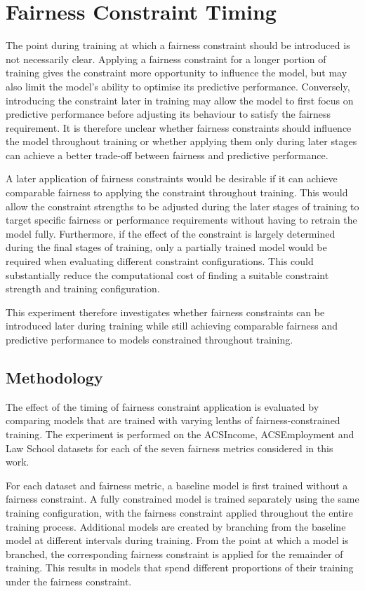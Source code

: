\chapter{Fairness Constraint Timing}
The point during training at which a fairness constraint should be introduced is not necessarily clear. Applying a fairness constraint for a longer portion of training gives the constraint more opportunity to influence the model, but may also limit the model's ability to optimise its predictive performance. Conversely, introducing the constraint later in training may allow the model to first focus on predictive performance before adjusting its behaviour to satisfy the fairness requirement. It is therefore unclear whether fairness constraints should influence the model throughout training or whether applying them only during later stages can achieve a better trade-off between fairness and predictive performance.

A later application of fairness constraints would be desirable if it can achieve comparable fairness to applying the constraint throughout training. This would allow the constraint strengths to be adjusted during the later stages of training to target specific fairness or performance requirements without having to retrain the model fully. Furthermore, if the effect of the constraint is largely determined during the final stages of training, only a partially trained model would be required when evaluating different constraint configurations. This could substantially reduce the computational cost of finding a suitable constraint strength and training configuration.

This experiment therefore investigates whether fairness constraints can be introduced later during training while still achieving comparable fairness and predictive performance to models constrained throughout training.

\section{Methodology}
The effect of the timing of fairness constraint application is evaluated by comparing models that are trained with varying lenths of fairness-constrained training. The experiment is performed on the ACSIncome, ACSEmployment and Law School datasets for each of the seven fairness metrics considered in this work.

For each dataset and fairness metric, a baseline model is first trained without a fairness constraint. A fully constrained model is trained separately using the same training configuration, with the fairness constraint applied throughout the entire training process. Additional models are created by branching from the baseline model at different intervals during training. From the point at which a model is branched, the corresponding fairness constraint is applied for the remainder of training. This results in models that spend different proportions of their training under the fairness constraint.

